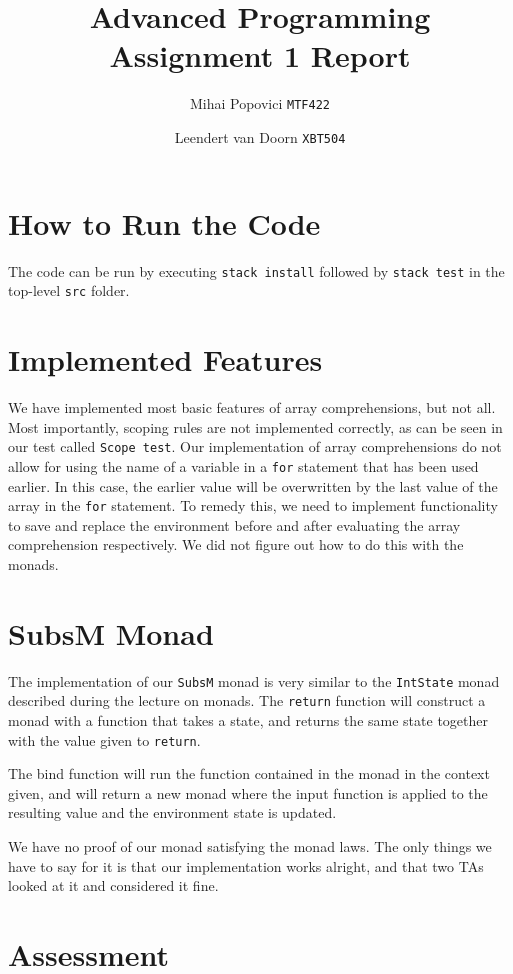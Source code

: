 \documentclass{article}
\title{Advanced Programming Assignment 1 Report}
\author{Mihai Popovici \texttt{MTF422} \and Leendert van Doorn \texttt{XBT504}}
\begin{document}
\maketitle

\section{How to Run the Code}
The code can be run by executing \texttt{stack install} followed by \texttt{stack test} in the top-level \texttt{src} folder.

\section{Implemented Features}
We have implemented most basic features of array comprehensions, but not all. Most importantly, scoping rules are not implemented correctly, as can be seen in our test called \texttt{Scope test}. Our implementation of array comprehensions do not allow for using the name of a variable in a \texttt{for} statement that has been used earlier. In this case, the earlier value will be overwritten by the last value of the array in the \texttt{for} statement. To remedy this, we need to implement functionality to save and replace the environment before and after evaluating the array comprehension respectively. We did not figure out how to do this with the monads. 

		

\section{SubsM Monad}
The implementation of our \texttt{SubsM} monad is very similar to the \texttt{IntState} monad described during the lecture on monads. The \texttt{return} function will construct a monad with a function that takes a state, and returns the same state together with the value given to \texttt{return}. 

The bind function will run the function contained in the monad in the context given, and will return a new monad where the input function is applied to the resulting value and the environment state is updated.

We have no proof of our monad satisfying the monad laws. The only things we have to say for it is that our implementation works alright, and that two TAs looked at it and considered it fine.

\section{Assessment}
\end{document}

